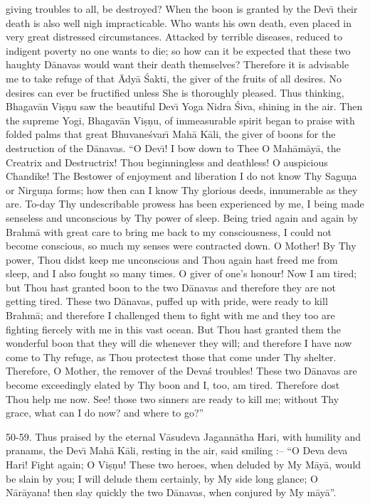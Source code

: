 giving troubles to all, be destroyed? When the boon is granted by the Dev\={\i} their death is also well nigh impracticable. Who wants his own death, even placed in very great distressed circumstances. Attacked by terrible diseases, reduced to indigent poverty no one wants to die; so how can it be expected that these two haughty D\=anavas would want their death themselves? Therefore it is advisable me to take refuge of that \=Ady\=a \'Sakti, the giver of the fruits of all desires. No desires can ever be fructified unless She is thoroughly pleased. Thus thinking, Bhagav\=an Vi\d{s}\d{n}u saw the beautiful Dev\={\i} Yoga Nidra \'Siva, shining in the air. Then the supreme Yogi, Bhagav\=an Vi\d{s}\d{n}u, of immeasurable spirit began to praise with folded palms that great Bhuvane\'svar\={\i} Mah\=a K\=ali, the giver of boons for the destruction of the D\=anavas. ``O Dev\={\i}! I bow down to Thee O Mah\=am\=ay\=a, the Creatrix and Destructrix! Thou beginningless and deathless! O auspicious Chandike! The Bestower of enjoyment and liberation I do not know Thy Sagu\d{n}a or Nirgu\d{n}a forms; how then can I know Thy glorious deeds, innumerable as they are. To-day Thy undescribable prowess has been experienced by me, I being made senseless and unconscious by Thy power of sleep. Being tried again and again by Brahm\=a with great care to bring me back to my consciousness, I could not become conscious, so much my senses were contracted down. O Mother! By Thy power, Thou didst keep me unconscious and Thou again hast freed me from sleep, and I also fought so many times. O giver of one's honour! Now I am tired; but Thou hast granted boon to the two D\=anavas and therefore they are not getting tired. These two D\=anavas, puffed up with pride, were ready to kill Brahm\=a; and therefore I challenged them to fight with me and they too are fighting fiercely with me in this vast ocean. But Thou hast granted them the wonderful boon that they will die whenever they will; and therefore I have now come to Thy refuge, as Thou protectest those that come under Thy shelter. Therefore, O Mother, the remover of the Deva\'s troubles! These two D\=anavas are become exceedingly elated by Thy boon and I, too, am tired. Therefore dost Thou help me now. See! those two sinners are ready to kill me; without Thy grace, what can I do now? and where to go?''

50-59. Thus praised by the eternal V\=asudeva Jagann\=atha Hari, with humility and pranams, the Dev\={\i} Mah\=a K\=ali, resting in the air, said smiling :-- ``O Deva deva Hari! Fight again; O Vi\d{s}\d{n}u! These two heroes, when deluded by My M\=ay\=a, would be slain by you; I will delude them certainly, by My side long glance; O N\=ar\=ayana! then slay quickly the two D\=anavas, when conjured by My m\=ay\=a''.

